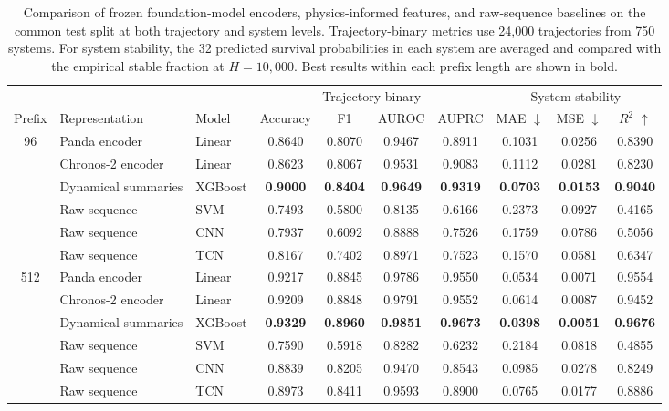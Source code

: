 \begin{table}[t]
\centering
\caption{Comparison of frozen foundation-model encoders, physics-informed features, and raw-sequence baselines on the common test split at both trajectory and system levels. Trajectory-binary metrics use 24,000 trajectories from 750 systems. For system stability, the 32 predicted survival probabilities in each system are averaged and compared with the empirical stable fraction at $H=10{,}000$. Best results within each prefix length are shown in bold.}
\label{tab:task_b_two_level}
\begin{tabular}{cllccccccc}
\toprule
& & & \multicolumn{4}{c}{Trajectory binary} & \multicolumn{3}{c}{System stability} \\
\cmidrule(lr){4-7}\cmidrule(lr){8-10}
Prefix & Representation & Model & Accuracy & F1 & AUROC & AUPRC & MAE $\downarrow$ & MSE $\downarrow$ & $R^2$ $\uparrow$ \\
\midrule
\multirow{6}{*}{96} & Panda encoder & Linear & 0.8640 & 0.8070 & 0.9467 & 0.8911 & 0.1031 & 0.0256 & 0.8390 \\
 & Chronos-2 encoder & Linear & 0.8623 & 0.8067 & 0.9531 & 0.9083 & 0.1112 & 0.0281 & 0.8230 \\
 & Dynamical summaries & XGBoost & \textbf{0.9000} & \textbf{0.8404} & \textbf{0.9649} & \textbf{0.9319} & \textbf{0.0703} & \textbf{0.0153} & \textbf{0.9040} \\
 & Raw sequence & SVM & 0.7493 & 0.5800 & 0.8135 & 0.6166 & 0.2373 & 0.0927 & 0.4165 \\
 & Raw sequence & CNN & 0.7937 & 0.6092 & 0.8888 & 0.7526 & 0.1759 & 0.0786 & 0.5056 \\
 & Raw sequence & TCN & 0.8167 & 0.7402 & 0.8971 & 0.7523 & 0.1570 & 0.0581 & 0.6347 \\
\midrule
\multirow{6}{*}{512} & Panda encoder & Linear & 0.9217 & 0.8845 & 0.9786 & 0.9550 & 0.0534 & 0.0071 & 0.9554 \\
 & Chronos-2 encoder & Linear & 0.9209 & 0.8848 & 0.9791 & 0.9552 & 0.0614 & 0.0087 & 0.9452 \\
 & Dynamical summaries & XGBoost & \textbf{0.9329} & \textbf{0.8960} & \textbf{0.9851} & \textbf{0.9673} & \textbf{0.0398} & \textbf{0.0051} & \textbf{0.9676} \\
 & Raw sequence & SVM & 0.7590 & 0.5918 & 0.8282 & 0.6232 & 0.2184 & 0.0818 & 0.4855 \\
 & Raw sequence & CNN & 0.8839 & 0.8205 & 0.9470 & 0.8543 & 0.0985 & 0.0278 & 0.8249 \\
 & Raw sequence & TCN & 0.8973 & 0.8411 & 0.9593 & 0.8900 & 0.0765 & 0.0177 & 0.8886 \\
\bottomrule
\end{tabular}
\end{table}
